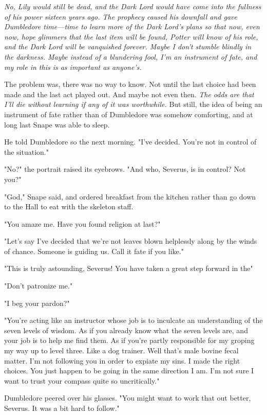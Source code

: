 \emph{No, Lily would still be dead, and the Dark Lord would have come into the fullness of his power sixteen years ago. The prophecy caused his downfall and gave Dumbledore time—time to learn more of the Dark Lord's plans so that now, even now, hope glimmers that the last item will be found, Potter will know of his role, and the Dark Lord will be vanquished forever. Maybe I don't stumble blindly in the darkness. Maybe instead of a blundering fool, I'm an instrument of fate, and my role in this is as important as anyone's.}

The problem was, there was no way to know. Not until the last choice had been made and the last act played out. And maybe not even then. \emph{The odds are that I'll die without learning if any of it was worthwhile.} But still, the idea of being an instrument of fate rather than of Dumbledore was somehow comforting, and at long last Snape was able to sleep.

He told Dumbledore so the next morning. "I've decided. You're not in control of the situation."

"No?" the portrait raised its eyebrows. "And who, Severus, is in control? Not you?"

"God," Snape said, and ordered breakfast from the kitchen rather than go down to the Hall to eat with the skeleton staff.

"You amaze me. Have you found religion at last?"

"Let's say I've decided that we're not leaves blown helplessly along by the winds of chance. Someone is guiding us. Call it fate if you like."

"This is truly astounding, Severus! You have taken a great step forward in the{\el}"

"Don't patronize me."

"I beg your pardon?"

"You're acting like an instructor whose job is to inculcate an understanding of the seven levels of wisdom. As if you already know what the seven levels are, and your job is to help me find them. As if you're partly responsible for my groping my way up to level three. Like a dog trainer. Well that's male bovine fecal matter. I'm not following you in order to expiate my sins. I made the right choices. You just happen to be going in the same direction I am. I'm not sure I want to trust your compass quite so uncritically."

Dumbledore peered over his glasses. "You might want to work that out better, Severus. It was a bit hard to follow."

